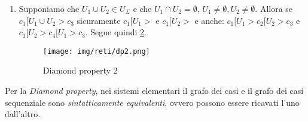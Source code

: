 \begin{definizione} 
\begin{enumerate}
              Da $c_1[e_1 > c_2[e_2  >$ segue:
              \begin{equation}
                  ^{\bullet} e_1 \cap ^{\bullet} e_2 = \emptyset \ \land \
                  e_1^{\bullet} \cap e_2^{\bullet} = \emptyset
              \end{equation}
              in $c_2$, infatti, le precondizioni di $e_1$ sono false mentre le
              precondizioni di $e_2$ sono vere e quindi $e_1$ e $e_2$ non possono
              avere precondizioni in comune. Inoltre, sempre in $c_2$ le post-condizioni
              di $e_1$ sono vere, mentre quelle di $e_2$ sono false, e quindi
              $e_1$ e $e_2$ non possono avere post-condizioni in comune. Segue
              quindi \ref{fig:dp1}.
              \begin{figure}[!ht]
                  \centering
                  \texttt{[image: img/reti/dp1.png]}
                  \caption{Diamond property 1}
                  \label{fig:dp1}
              \end{figure}
        \item Supponiamo che $U_1 \cup U_2 \in U_{\Sigma}$ e che
              $U_1 \cap U_2 = \emptyset$, $U_1 \neq \emptyset, U_2 \neq \emptyset$.
              Allora se $c_1[U_1 \cup U_2 >c_3$ sicuramente $c_1[U_1 >$ e $c_1[U_2 >$
              e anche: $c_1[U_1 > c_2[U_2 >c_3$ e $c_1[U_2 > c_4[U_1 >c_3$. Segue
              quindi \ref{fig:dp2}.
              \begin{figure}[!ht]
                  \centering
                  \texttt{[image: img/reti/dp2.png]}
                  \caption{Diamond property 2}
                  \label{fig:dp2}
              \end{figure}
    \end{enumerate}
\end{definizione}
Per la \textit{Diamond property}, nei sistemi elementari il grafo dei casi e il
grafo dei casi sequenziale sono \textit{sintatticamente equivalenti}, ovvero
possono essere ricavati l'uno dall'altro.

